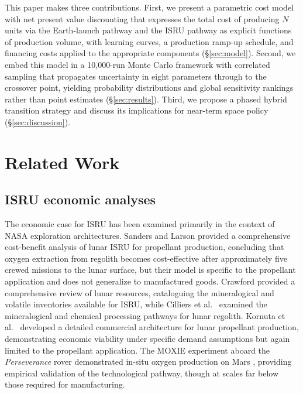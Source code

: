 \documentclass[preprint,12pt]{elsarticle}
\begin{document}
This paper makes three contributions. First, we present a parametric cost model with net present value discounting that expresses the total cost of producing $N$ units via the Earth-launch pathway and the ISRU pathway as explicit functions of production volume, with learning curves, a production ramp-up schedule, and financing costs applied to the appropriate components (\S\ref{sec:model}). Second, we embed this model in a 10{,}000-run Monte Carlo framework with correlated sampling that propagates uncertainty in eight parameters through to the crossover point, yielding probability distributions and global sensitivity rankings rather than point estimates (\S\ref{sec:results}). Third, we propose a phased hybrid transition strategy and discuss its implications for near-term space policy (\S\ref{sec:discussion}).

\section{Related Work}
\label{sec:related}

\subsection{ISRU economic analyses}

The economic case for ISRU has been examined primarily in the context of NASA exploration architectures. Sanders and Larson \cite{sanders2015} provided a comprehensive cost-benefit analysis of lunar ISRU for propellant production, concluding that oxygen extraction from regolith becomes cost-effective after approximately five crewed missions to the lunar surface, but their model is specific to the propellant application and does not generalize to manufactured goods. Crawford \cite{crawford2015} provided a comprehensive review of lunar resources, cataloguing the mineralogical and volatile inventories available for ISRU, while Cilliers et al.\ \cite{cilliers2023} examined the mineralogical and chemical processing pathways for lunar regolith. Kornuta et al.\ \cite{kornuta2019} developed a detailed commercial architecture for lunar propellant production, demonstrating economic viability under specific demand assumptions but again limited to the propellant application. The MOXIE experiment aboard the \textit{Perseverance} rover demonstrated in-situ oxygen production on Mars \cite{hecht2021}, providing empirical validation of the technological pathway, though at scales far below those required for manufacturing.
\end{document}

